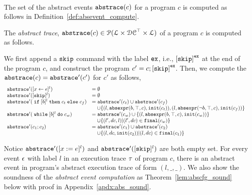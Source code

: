 \\
The set of the abstract events $\mathtt{abs}{\mathtt{trace}}(c)$ for a program $c$
is computed as follows in Definition~\ref{def:absevent_compute}.
 \begin{defn}
 \label{def:absevent_compute}
 The \emph{abstract trace}, $\mathtt{abs}{\mathtt{trace}}(c) \in \mathcal{P}( \mathcal{L} \times \mathcal{DC}^{\top} \times \mathcal{L} )$ of a program $c$  is computed as follows.

 We first append a $\mathtt{skip}$ command with 
the label $\mathtt{ex}$, i.e., $\clabel{\eskip}^{{\lex}}$ at the end of the program $c$, and construct 
the program $c' = c;\clabel{\eskip}^{{\lex}}$.
Then, we compute the $\mathtt{abs}{\mathtt{trace}}(c) = \mathtt{abs}{\mathtt{trace}}'(c')$ for $c'$ as follows,
 {
 \[
   \begin{array}{ll}
      \absflow'(\clabel{\assign{x}{\expr}}{}^l)  & = \emptyset  \\
      \absflow'([\eskip]^{l})  & = \emptyset \\
      \absflow'(\eif [b]^l \ethen c_t \eelse c_f)  & =  \absflow'(c_t) \cup \absflow'(c_f)
        \\ & \quad 
        \cup \{(l, \absexpr(\bexpr, \top, c),  \absinit(c_t) ) ,  (l, \absexpr(\neg\bexpr, \top, c), \absinit(c_f)) \} \\
       \absflow'(\ewhile [b]^l \edo c_w)  & =  \absflow'(c_w) \cup \{(l, \absexpr(\bexpr, \top, c), \absinit(c_w)) \} 
       \\ & \quad 
       \cup \{(l', dc, l)| (l', dc) \in \absfinal(c_w) \} \\
       \absflow'(c_1 ; c_2)  & = \absflow'(c_1) \cup  \absflow'(c_2) 
       \\ & \quad 
       \cup \{ (l, dc, \absinit(c_2)) | (l, dc) \in \absfinal(c_1) \} \\
   \end{array}
   \]
   }
  \end{defn}
  Notice $\mathtt{abs}{\mathtt{trace}}'([x := e]^{l})$ and $\mathtt{abs}{\mathtt{trace}}'([\mathtt{skip}]^{l})$ are both empty set. 
   For every event $\mathtt{\epsilon}$ with label $l$ in an execution trace $\mathtt{\tau}$ of program $c$, 
   there is an abstract event in program's abstract execution trace of form $(l, \_, \_)$.  
   We also show the soundness of the \emph{abstract event computation} as Theorem~\ref{lem:abscfg_sound} below with proof in Appendix~\ref{apdx:abs_sound}.
